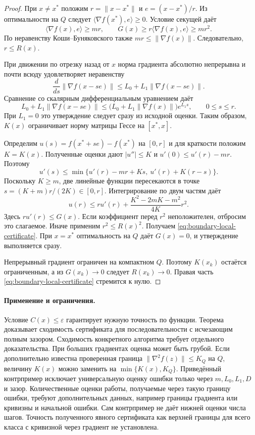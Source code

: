 \begin{proof}
При $x\ne x^*$ положим $r=\|x-x^*\|$ и $e=(x-x^*)/r$.
Из оптимальности на $Q$ следует
$\langle\nabla f(x^*),e\rangle\ge0$. Условие секущей даёт
\[
 \langle\nabla f(x),e\rangle\ge mr,\qquad
 G(x)\ge r\langle\nabla f(x),e\rangle\ge mr^2.
\]
По неравенству Коши--Буняковского также
$mr\le\|\nabla f(x)\|$. Следовательно, $r\le R(x)$.

При движении по отрезку назад от $x$ норма градиента абсолютно
непрерывна и почти всюду удовлетворяет неравенству
\[
 \frac{d}{ds}\|\nabla f(x-se)\|
 \le L_0+L_1\|\nabla f(x-se)\|.
\]
Сравнение со скалярным дифференциальным уравнением даёт
\[
 L_0+L_1\|\nabla f(x-se)\|
 \le\bigl(L_0+L_1\|\nabla f(x)\|\bigr)e^{L_1s},
       \qquad 0\le s\le r.
\]
При $L_1=0$ это утверждение следует сразу из исходной оценки.
Таким образом, $K(x)$ ограничивает норму матрицы Гессе на $[x^*,x]$.

Определим $u(s)=f(x^*+se)-f(x^*)$ на $[0,r]$ и для краткости
положим $K=K(x)$. Полученные оценки дают $|u''|\le K$ и
$u'(0)\le u'(r)-mr$. Поэтому
\[
 u'(s)\le
 \min\{u'(r)-mr+Ks,\ u'(r)+K(r-s)\}.
\]
Поскольку $K\ge m$, две линейные функции пересекаются в точке
$s=(K+m)r/(2K)\in[0,r]$. Интегрирование по двум частям даёт
\begin{equation}\label{eq:boundary-tent-integral}
 u(r)\le r u'(r)
       +\frac{K^2-2mK-m^2}{4K}r^2.
\end{equation}
Здесь $r u'(r)\le G(x)$. Если коэффициент перед $r^2$ неположителен,
отбросим это слагаемое. Иначе применим $r^2\le R(x)^2$.
Получаем \eqref{eq:boundary-local-certificate}. При $x=x^*$
оптимальность на $Q$ даёт $G(x)=0$, и утверждение выполняется сразу.

Непрерывный градиент ограничен на компактном $Q$. Поэтому $K(x_k)$
остаётся ограниченным, а из $G(x_k)\to0$ следует $R(x_k)\to0$.
Правая часть \eqref{eq:boundary-local-certificate} стремится к нулю.
\end{proof}

\paragraph{Применение и ограничения.}
Условие $C(x)\le\varepsilon$ гарантирует нужную точность по функции.
Теорема доказывает сходимость сертификата для последовательности с
исчезающим полным зазором. Сходимость конкретного алгоритма требует
отдельного доказательства. При больших градиентах оценка может быть
грубой. Если дополнительно известна проверенная граница
$\|\nabla^2f(z)\|\le K_Q$ на $Q$, величину $K(x)$ можно заменить на
$\min\{K(x),K_Q\}$. Приведённый контрпример исключает универсальную
оценку ошибки только через $m,L_0,L_1,D$ и зазор. Количественные
оценки работы, получаемые через такую границу ошибки, требуют
дополнительных данных, например границы градиента или кривизны
и начальной ошибки. Сам контрпример не даёт нижней оценки числа шагов.
Точность полученного явного сертификата как верхней границы для
всего класса с кривизной через градиент не установлена.
